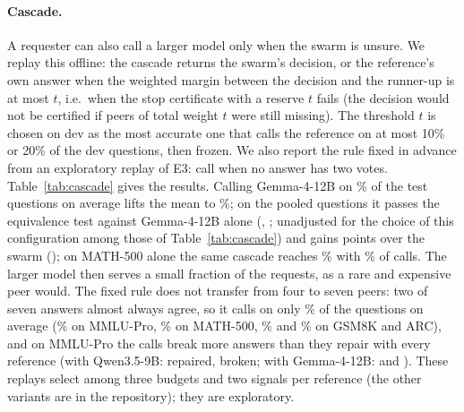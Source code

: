 \documentclass[11pt]{article}
\theoremstyle{definition}
\theoremstyle{remark}
\begin{document}
\paragraph{Cascade.} A requester can also call a larger model only when the swarm is unsure. We replay
this offline: the cascade returns the swarm's decision, or the reference's own answer when the weighted
margin between the decision and the runner-up is at most $t$, i.e.\ when the stop certificate with a reserve
$t$ fails (the decision would not be certified if peers of total weight $t$ were still missing). The
threshold $t$ is chosen on dev as the most accurate one that calls the reference on at most 10\% or 20\% of
the dev questions, then frozen. We also report the rule fixed in advance from an exploratory replay of E3:
call when no answer has two votes. Table~\ref{tab:cascade} gives the results. Calling Gemma-4-12B on
\eFourCascGemmaTwelveMarTwentyCalls\% of the test questions on average lifts the mean to
\eFourCascGemmaTwelveMarTwentyAcc\%; on the pooled questions it passes the equivalence test against
Gemma-4-12B alone (\eFourCascGemmaTwelveMarTwentyDiff, \eFourCascGemmaTwelveMarTwentyCI; unadjusted for
the choice of this configuration among those of Table~\ref{tab:cascade}) and gains
\eFourCascGemmaTwelveMarTwentySwarmDiff{} points over the swarm (\eFourCascGemmaTwelveMarTwentySwarmCI); on
MATH-500 alone the same cascade reaches \eFourCascGemmaTwelveMarTwentyMathAcc\% with
\eFourCascGemmaTwelveMarTwentyMathCalls\% of calls. The larger model then serves a small fraction of the
requests, as a rare and expensive peer would. The fixed rule does not transfer from four to seven peers:
two of seven answers almost always agree, so it calls on only \eFourCascQwenNineSupTwoCalls\% of the
questions on average (\eFourCascQwenNineSupTwoMmluCalls\% on MMLU-Pro, \eFourCascQwenNineSupTwoMathCalls\% on
MATH-500, \eFourCascQwenNineSupTwoGsmCalls\% and \eFourCascQwenNineSupTwoArcCalls\% on GSM8K and ARC), and on
MMLU-Pro the calls break more answers than they repair with every reference (with Qwen3.5-9B:
\eFourCascQwenNineSupTwoMmluRescued{} repaired, \eFourCascQwenNineSupTwoMmluBroken{} broken; with
Gemma-4-12B: \eFourCascGemmaTwelveSupTwoMmluRescued{} and \eFourCascGemmaTwelveSupTwoMmluBroken). These replays select among three budgets and two signals per
reference (the other variants are in the repository); they are exploratory.
\end{document}
